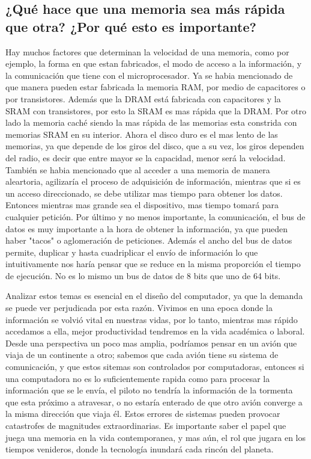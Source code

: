 \documentclass{article}
\begin{document}
\subsection{¿Qué hace que una memoria sea más rápida que otra?
            ¿Por qué esto es importante?}\label{pregunta4}
Hay muchos factores que determinan la velocidad de una memoria, como por ejemplo, la forma en que estan fabricados, el modo de acceso a la información, y la comunicación que tiene con el microprocesador.
Ya se habia mencionado de que manera pueden estar fabricada la memoria RAM, por medio de capacitores o por transistores. Además que la DRAM está fabricada con capacitores y la SRAM con transistores, por esto la SRAM es mas rápida que la DRAM. Por otro lado la memoria caché siendo la mas rápida de las memorias esta constrida con memorias SRAM en su interior.
Ahora el disco duro es el mas lento de las memorias, ya que depende de los giros del disco, que a su vez, los giros dependen del radio, es decir que entre mayor se la capacidad, menor será la velocidad.
También se habia mencionado que al acceder a una memoria de manera aleartoria, agilizaría el proceso de adquisición de información, mientras que si es un acceso direccionado, se debe utilizar mas tiempo para obtener los datos. Entonces mientras mas grande sea el dispositivo, mas tiempo tomará para cualquier petición.
Por último y no menos importante, la comunicación, el bus de datos es muy importante a la hora de obtener la información, ya que pueden haber "tacos" o aglomeración de peticiones. Además el ancho del bus de datos permite, duplicar y hasta cuadriplicar el envío de información lo que intuitivamente nos haría pensar que se reduce en la misma proporción el tiempo de ejecución. No es lo mismo un bus de datos de 8 bits que uno de 64 bits.

Analizar estos temas es esencial en el diseño del computador, ya que la demanda se puede ver perjudicada por esta razón. Vivimos en una epoca donde la información se volvió vital en nuestras vidas, por lo tanto, mientras mas rápido accedamos a ella, mejor productividad tendremos en la vida académica o laboral. 
Desde una perspectiva un poco mas amplia, podríamos pensar en un avión que viaja de un continente a otro; sabemos que cada avión tiene su sistema de comunicación, y que estos sitemas son controlados por computadoras, entonces si una computadora no es lo suficientemente rapida como para procesar la información que se le envía, el piloto no tendría la información de la tormenta que esta próximo a atravesar, o no estaría enterado de que otro avión converge a la misma dirección que viaja él. Estos errores de sistemas pueden provocar catastrofes de magnitudes extraordinarias.
Es importante saber el papel que juega una memoria en la vida contemporanea, y mas aún, el rol que jugara en los tiempos venideros, donde la tecnología inundará cada rincón del planeta.
\end{document}
